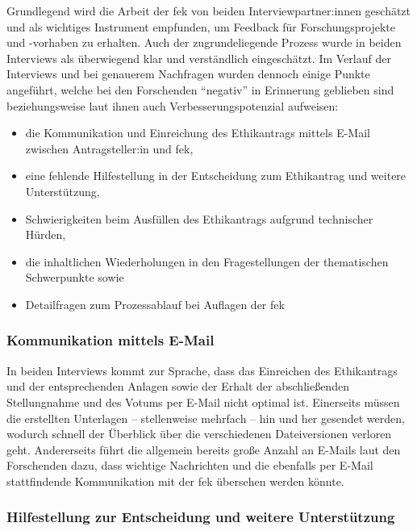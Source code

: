 \documentclass[a4paper,12pt,twoside,numbers=noendperiod]{scrreprt}
\begin{document}
Grundlegend wird die Arbeit der \ac{fek} von beiden Interviewpartner:innen geschätzt und als wichtiges Instrument empfunden, um Feedback für Forschungsprojekte und -vorhaben zu erhalten. Auch der zugrundeliegende Prozess wurde in beiden Interviews als überwiegend klar und verständlich eingeschätzt. Im Verlauf der Interviews und bei genauerem Nachfragen wurden dennoch einige Punkte angeführt, welche bei den Forschenden \enquote{negativ} in Erinnerung geblieben sind beziehungsweise laut ihnen auch Verbesserungspotenzial aufweisen:
\begin{itemize}
    \item die Kommunikation und Einreichung des Ethikantrags mittels E-Mail zwischen Antragsteller:in und \ac{fek},
    \item eine fehlende Hilfestellung in der Entscheidung zum Ethikantrag und weitere Unterstützung,
    \item Schwierigkeiten beim Ausfüllen des Ethikantrags aufgrund technischer Hürden,
    \item die inhaltlichen Wiederholungen in den Fragestellungen der thematischen Schwerpunkte sowie
    \item Detailfragen zum Prozessablauf bei Auflagen der \ac{fek}
\end{itemize}

\subsubsection*{Kommunikation mittels E-Mail}
\label{sub-sub-sec:kommunikation-email}

In beiden Interviews kommt zur Sprache, dass das Einreichen des Ethikantrags und der entsprechenden Anlagen sowie der Erhalt der abschließenden Stellungnahme und des Votums per E-Mail nicht optimal ist. Einerseits müssen die erstellten Unterlagen -- stellenweise mehrfach -- hin und her gesendet werden, wodurch schnell der Überblick über die verschiedenen Dateiversionen verloren geht. Andererseits führt die allgemein bereits große Anzahl an E-Mails laut den Forschenden dazu, dass wichtige Nachrichten und die ebenfalls per E-Mail stattfindende Kommunikation mit der \ac{fek} übersehen werden könnte.

\subsubsection*{Hilfestellung zur Entscheidung und weitere Unterstützung}
\label{sub-sub-sec:hilfestellung-unterstützung}
\end{document}
